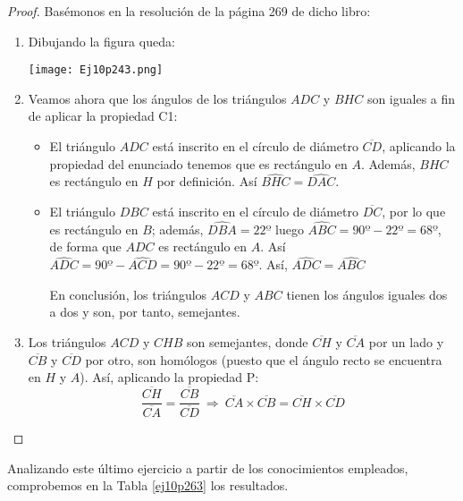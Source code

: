 \begin{proof} Basémonos en la resolución de la página 269 de dicho libro:
	\begin{enumerate}
		\item Dibujando la figura queda:
		\begin{center}
			\texttt{[image: Ej10p243.png]}
		\end{center}
		\item  Veamos ahora que los ángulos de los triángulos $ADC$ y $BHC$ son iguales a fin de aplicar la propiedad C1:
		\begin{itemize}
			\item El triángulo $ADC$ está inscrito en el círculo de diámetro $\overline{CD}$, aplicando la propiedad del enunciado tenemos que es rectángulo en $A$. Además, $BHC$ es rectángulo en $H$ por definición. Así $\hat{BHC}=\hat{DAC}$.
			\item El triángulo $DBC$ está inscrito en el círculo de diámetro $\overline{DC}$, por lo que es rectángulo en $B$; además, $\hat{DBA}=22º$ luego $\hat{ABC}=90º-22º=68º$, de forma que $ADC$ es rectángulo en $A$. Así $\hat{ADC}=90º-\hat{ACD}=90º-22º=68º$. Así, $\hat{ADC}=\hat{ABC}$
			
			En conclusión, los triángulos $ACD$ y $ABC$ tienen los ángulos iguales dos a dos y son, por tanto, semejantes.
		\end{itemize}
		\item Los triángulos $ACD$ y $CHB$ son semejantes, donde $\overline{CH}$ y $\overline{CA}$ por un lado y $\overline{CB}$ y $\overline{CD}$ por otro, son homólogos (puesto que el ángulo recto se encuentra en $H$ y $A$). Así, aplicando la propiedad P: $$\dfrac{\overline{CH}}{\overline{CA}}=\dfrac{\overline{CB}}{\overline{CD}} \ \Longrightarrow \ \overline{CA}\times\overline{CB}=\overline{CH}\times\overline{CD}$$
	\end{enumerate}
\end{proof}
	 
	 Analizando este último ejercicio a partir de los conocimientos empleados, comprobemos en la Tabla \ref{ej10p263} los resultados.
	 
